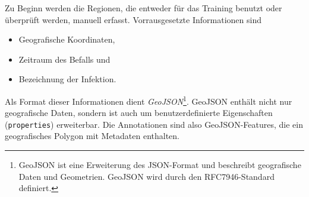 Zu Beginn werden die Regionen, die entweder für das Training benutzt oder überprüft werden, manuell erfasst. Vorrausgesetzte Informationen sind
\begin{itemize}
	\item Geografische Koordinaten,
	\item Zeitraum des Befalls und
	\item Bezeichnung der Infektion.
\end{itemize}
Als Format dieser Informationen dient \textit{GeoJSON}\footnote{GeoJSON ist eine Erweiterung des JSON-Format und beschreibt geografische Daten und Geometrien. GeoJSON wird durch den RFC7946-Standard definiert.}. GeoJSON enthält nicht nur geografische Daten, sondern ist auch um benutzerdefinierte Eigenschaften (\texttt{properties}) erweiterbar. Die Annotationen sind also GeoJSON-Features, die ein geografisches Polygon mit Metadaten enthalten.

